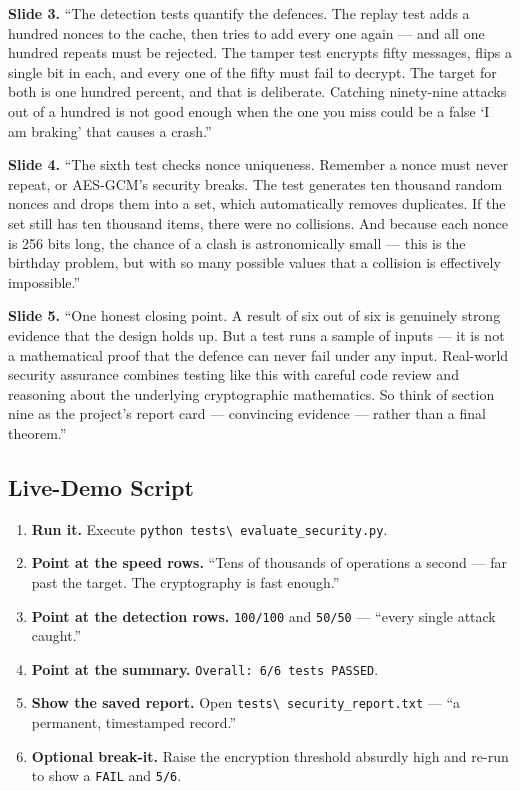\documentclass[11pt,a4paper]{article}
\begin{document}
\textbf{Slide 3.} ``The detection tests quantify the defences. The replay test
adds a hundred nonces to the cache, then tries to add every one again --- and all
one hundred repeats must be rejected. The tamper test encrypts fifty messages,
flips a single bit in each, and every one of the fifty must fail to decrypt. The
target for both is one hundred percent, and that is deliberate. Catching
ninety-nine attacks out of a hundred is not good enough when the one you miss
could be a false `I am braking' that causes a crash.''

\textbf{Slide 4.} ``The sixth test checks nonce uniqueness. Remember a nonce must
never repeat, or AES-GCM's security breaks. The test generates ten thousand
random nonces and drops them into a set, which automatically removes duplicates.
If the set still has ten thousand items, there were no collisions. And because
each nonce is 256 bits long, the chance of a clash is astronomically small ---
this is the birthday problem, but with so many possible values that a collision
is effectively impossible.''

\textbf{Slide 5.} ``One honest closing point. A result of six out of six is
genuinely strong evidence that the design holds up. But a test runs a sample of
inputs --- it is not a mathematical proof that the defence can never fail under
any input. Real-world security assurance combines testing like this with careful
code review and reasoning about the underlying cryptographic mathematics. So
think of section nine as the project's report card --- convincing evidence ---
rather than a final theorem.''

\subsection{Live-Demo Script}
\begin{enumerate}
  \item \textbf{Run it.} Execute \texttt{python tests\textbackslash
        evaluate\_security.py}.
  \item \textbf{Point at the speed rows.} ``Tens of thousands of operations a
        second --- far past the target. The cryptography is fast enough.''
  \item \textbf{Point at the detection rows.} \texttt{100/100} and \texttt{50/50}
        --- ``every single attack caught.''
  \item \textbf{Point at the summary.} \texttt{Overall: 6/6 tests PASSED}.
  \item \textbf{Show the saved report.} Open \texttt{tests\textbackslash
        security\_report.txt} --- ``a permanent, timestamped record.''
  \item \textbf{Optional break-it.} Raise the encryption threshold absurdly high
        and re-run to show a \texttt{FAIL} and \texttt{5/6}.
\end{enumerate}
\end{document}
